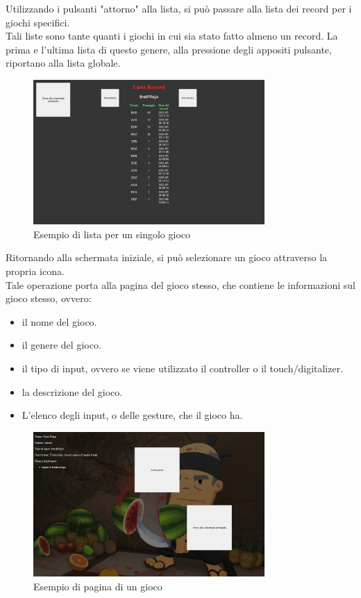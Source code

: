 Utilizzando i pulsanti "attorno" alla lista, si può passare alla lista dei record per i giochi specifici.\\
Tali liste sono tante quanti i giochi in cui sia stato fatto almeno un record.
La prima e l'ultima lista di questo genere, alla pressione degli appositi pulsante, riportano alla lista globale.
\begin{figure}[h]
    \centering
    \includegraphics[width=250pt]{images/product/schermataRecordSingoloGioco.png}
    \caption{Esempio di lista per un singolo gioco}
    \label{fig:schermataRecordSingoloGioco}
\end{figure}
\newpage
Ritornando alla schermata iniziale, si può selezionare un gioco attraverso la propria icona.\\
Tale operazione porta alla pagina del gioco stesso, che contiene le informazioni sul gioco stesso, ovvero:
\begin{itemize}
    \item il nome del gioco.
    \item il genere del gioco.
    \item il tipo di input, ovvero se viene utilizzato il controller o il touch/digitalizer.
    \item la descrizione del gioco.
    \item L'elenco degli input, o delle gesture, che il gioco ha.
\end{itemize}
\begin{figure}[h]
    \centering
    \includegraphics[width=250pt]{images/product/schermataPaginaGioco.png}
    \caption{Esempio di pagina di un gioco}
    \label{fig:schermataPaginaGioco}
\end{figure}
